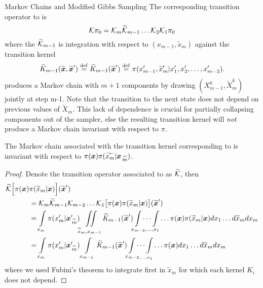 \begin{chapter}{Markov Chains and Modified Gibbs Sampling}
The corresponding transition operator to  is
\begin{equation}
  \mathcal K\pi_0 = \mathcal K_m \widetilde {\mathcal K}_{m-1}\dots \mathcal K_2 \mathcal K_1 \pi_0
\end{equation}
where the $\widetilde{\mathcal K}_{m-1}$ is integration with respect to $(x_{m-1},\tilde x_m)$ against the transition kernel
\begin{equation}
  \widetilde K_{m-1}(\widetilde{\mbox{\boldmath$x$}},\widetilde{\mbox{\boldmath$x$}}') \stackrel{\rm def}{=} \widetilde K_{m-1}(\widetilde{\mbox{\boldmath$x$}}') \stackrel{\rm def}{=} \pi(x_{m-1}',\widetilde x_m'|x_1',x_2',\dots,x_{m-2}').
\end{equation}
 produces a Markov chain with $m+1$ components by drawing $(X_{m-1}^k,\tilde X_m^k)$ jointly at step m-1. 
Note that the transition to the next state does not depend on previous values of $\tilde X_m$.
This lack of dependence is crucial for partially collapsing components out of the sampler, else the resulting transition kernel will \emph{not} produce a Markov chain invariant with respect to $\pi$.
\begin{prop}\label{thm:conditionedGibbsStationary}
  The Markov chain associated with the transition kernel corresponding to  is invariant with respect to $\pi(\mbox{\boldmath$x$})\pi(\widetilde{x_m}|\mbox{\boldmath$x$}_{\,\widehat{m}})$.
\end{prop}
\begin{proof}
  Denote the transition operator associated to  as $\widetilde {\mathcal K}$, then
  \begin{align}
    \widetilde{\mathcal K}\Big[ \pi(\mbox{\boldmath$x$})&\pi(\widetilde x_m|\mbox{\boldmath$x$})\Big](\widetilde{\mbox{\boldmath$x$}}') \nonumber \\ 
    &= \mathcal K_m \widetilde{\mathcal K}_{m-1} \mathcal K_{m-2}\dots\mathcal K_{1} \big[\pi(\mbox{\boldmath$x$})\pi(\widetilde x_m|\mbox{\boldmath$x$})\big](\widetilde{\mbox{\boldmath$x$}}') \nonumber\\
    &= \int\limits_{x_m} \pi(x_m'|\mbox{\boldmath$x$}_{\,\widehat{m}}')\iint\limits_{\widetilde x_m,x_{m-1}}\widetilde K_{m-1}(\widetilde{\mbox{\boldmath$x$}}')\idotsint\limits_{x_{m-2},\dots,x_1}\dots \pi(\mbox{\boldmath$x$})\pi(\widetilde x_m|\mbox{\boldmath$x$})dx_1\dots d\widetilde x_m dx_m \nonumber\\
    &= \int\limits_{x_m} \pi(x_m'|\mbox{\boldmath$x$}_{\,\widehat{m}}')\int\limits_{x_{m-1}}\widetilde K_{m-1}(\widetilde{\mbox{\boldmath$x$}}')\idotsint\limits_{x_{m-2,\dots,x_1}}\dots \pi(\mbox{\boldmath$x$})dx_1\dots d\widetilde x_m dx_m \label{eq:conditionedGibbsCalc}
  \end{align}
  where we used Fubini's theorem to integrate first in $\tilde x_m$ for which each kernel $K_i$ does not depend. 

\end{proof}
\end{chapter}
